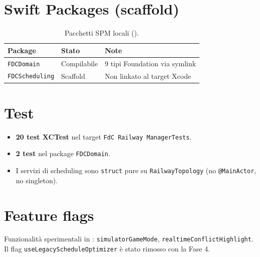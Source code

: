 \section{Swift Packages (scaffold)}

\begin{table}[htbp]
\centering
\caption{Pacchetti SPM locali ().}
\begin{tabular}{lll}
  \toprule
  \textbf{Package} & \textbf{Stato} & \textbf{Note} \\
  \midrule
  \texttt{FDCDomain}   & Compilabile & 9 tipi Foundation via symlink \\
  \texttt{FDCScheduling} & Scaffold & Non linkato al target Xcode \\
  \bottomrule
\end{tabular}
\end{table}

\section{Test}

\begin{itemize}
  \item \textbf{20 test XCTest} nel target \texttt{FdC Railway ManagerTests}.
  \item \textbf{2 test} nel package \texttt{FDCDomain}.
  \item I servizi di scheduling sono \texttt{struct} pure su
    \texttt{RailwayTopology} (no \texttt{@MainActor}, no singleton).
\end{itemize}

\section{Feature flags}

Funzionalità sperimentali in :
\texttt{simulatorGameMode}, \texttt{realtimeConflictHighlight}.
Il flag \texttt{useLegacyScheduleOptimizer} è stato rimosso con la Fase 4.
